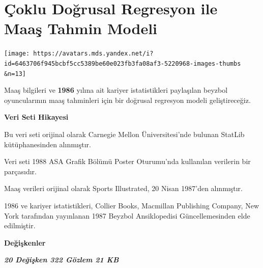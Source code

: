 \documentclass[
]{article}
\author{İrfan YAKUT}
\date{16-11-2023}
\begin{document}
\hypertarget{uxe7oklu-doux11frusal-regresyon-ile-maaux15f-tahmin-modeli}{%
\section{\texorpdfstring{\textbf{Çoklu Doğrusal Regresyon ile Maaş
Tahmin
Modeli}}{Çoklu Doğrusal Regresyon ile Maaş Tahmin Modeli}}\label{uxe7oklu-doux11frusal-regresyon-ile-maaux15f-tahmin-modeli}}

\texttt{[image: https://avatars.mds.yandex.net/i?id=6463706f945bcbf5cc5389be60e023fb3fa08af3-5220968-images-thumbs\\\&n=13]}

Maaş bilgileri ve \textbf{1986} yılına ait kariyer istatistikleri
paylaşılan beyzbol oyuncularının maaş tahminleri için bir doğrusal
regresyon modeli geliştireceğiz.

\textbf{Veri Seti Hikayesi}

Bu veri seti orijinal olarak Carnegie Mellon Üniversitesi'nde bulunan
StatLib kütüphanesinden alınmıştır.

Veri seti 1988 ASA Grafik Bölümü Poster Oturumu'nda kullanılan verilerin
bir parçasıdır.

Maaş verileri orijinal olarak Sports Illustrated, 20 Nisan 1987'den
alınmıştır.

1986 ve kariyer istatistikleri, Collier Books, Macmillan Publishing
Company, New York tarafından yayınlanan 1987 Beyzbol Ansiklopedisi
Güncellemesinden elde edilmiştir.

\textbf{Değişkenler}

\textbf{\emph{20 Değişken 322 Gözlem 21 KB}}
\end{document}
